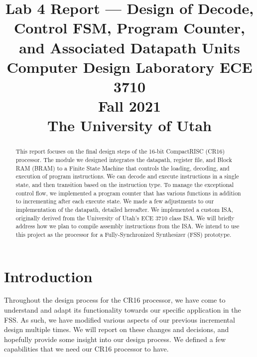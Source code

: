 \documentclass[conference]{IEEEtran}
\begin{document}
\title{Lab 4 Report --- Design of Decode, Control FSM, Program Counter, and Associated Datapath Units\\
\Large{Computer Design Laboratory ECE 3710}\\
\Large{Fall 2021}\\
\Large{The University of Utah}}

\author{
\and
{}
\and
{}
\and
{}
}

\maketitle
\begin{abstract}
This report focuses on the final design steps of the 16-bit CompactRISC (CR16) processor. The module we designed integrates the datapath, register file, and Block RAM (BRAM) to a Finite State Machine that controls the loading, decoding, and execution of program instructions. We can decode and execute instructions in a single state, and then transition based on the instruction type. To manage the exceptional control flow, we implemented a program counter that has various functions in addition to incrementing after each execute state. We made a few adjustments to our implementation of the datapath, detailed hereafter. We implemented a custom ISA, originally derived from the University of Utah's ECE 3710 class ISA. We will briefly address how we plan to compile assembly instructions from the ISA. We intend to use this project as the processor for a Fully-Synchronized Synthesizer (FSS) prototype.
\end{abstract}

\section{Introduction}
Throughout the design process for the CR16 processor, we have come to understand and adapt its functionality towards our specific application in the FSS. As such, we have modified various aspects of our previous incremental design multiple times. We will report on these changes and decisions, and hopefully provide some insight into our design process. We defined a few capabilities that we need our CR16 processor to have.
\end{document}
